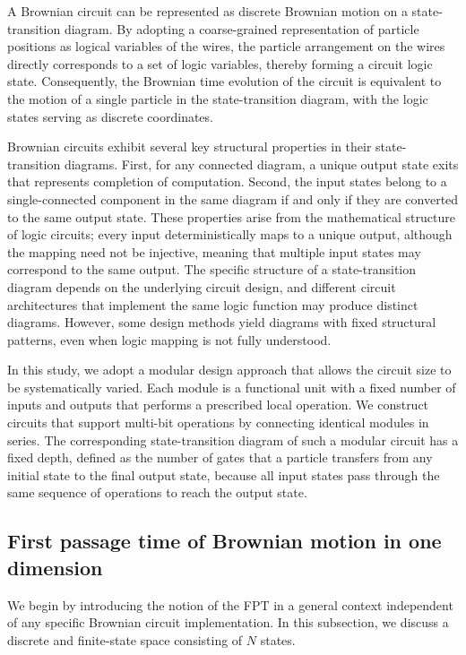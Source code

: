 \documentclass[%
 reprint,
superscriptaddress,
 amsmath,amssymb,
 aps,
 prx,
]{revtex4-2}
\begin{document}
A Brownian circuit can be represented as discrete Brownian motion on a state-transition diagram. By adopting a coarse-grained representation of particle positions as logical variables of the wires, the particle arrangement on the wires directly corresponds to a set of logic variables, thereby forming a circuit logic state. Consequently, the Brownian time evolution of the circuit is equivalent to the motion of a single particle in the state-transition diagram, with the logic states serving as discrete coordinates. 

Brownian circuits exhibit several key structural properties in their state-transition diagrams. 
First, for any connected diagram, a unique output state exits that represents completion of computation. Second, the input states belong to a single-connected component in the same diagram if and only if they are converted to the same output state.
These properties arise from the mathematical structure of logic circuits; every input deterministically maps to a unique output, although the mapping need not be injective, meaning that multiple input states may correspond to the same output. 
The specific structure of a state-transition diagram depends on the underlying circuit design, and different circuit architectures that implement the same logic function may produce distinct diagrams. However, some design methods yield diagrams with fixed structural patterns, even when logic mapping is not fully understood. 

In this study, we adopt a modular design approach that allows the circuit size to be systematically varied.  
Each module is a functional unit with a fixed number of inputs and outputs that performs a prescribed local operation. We construct circuits that support multi-bit operations by connecting identical modules in series. The corresponding state-transition diagram of such a modular circuit has a fixed depth, defined as the number of gates that a particle transfers from any initial state to the final output state, because all input states pass through the same sequence of operations to reach the output state.


\subsection{First passage time of Brownian motion in one dimension}\label{First Passage Time of Brownian Motion}
We begin by introducing the notion of the FPT in a general context independent of any specific Brownian circuit implementation. 
In this subsection, we discuss a discrete and finite-state space consisting of $N$ states\cite{gardiner1985hsm,Redner_2001}.
\end{document}
